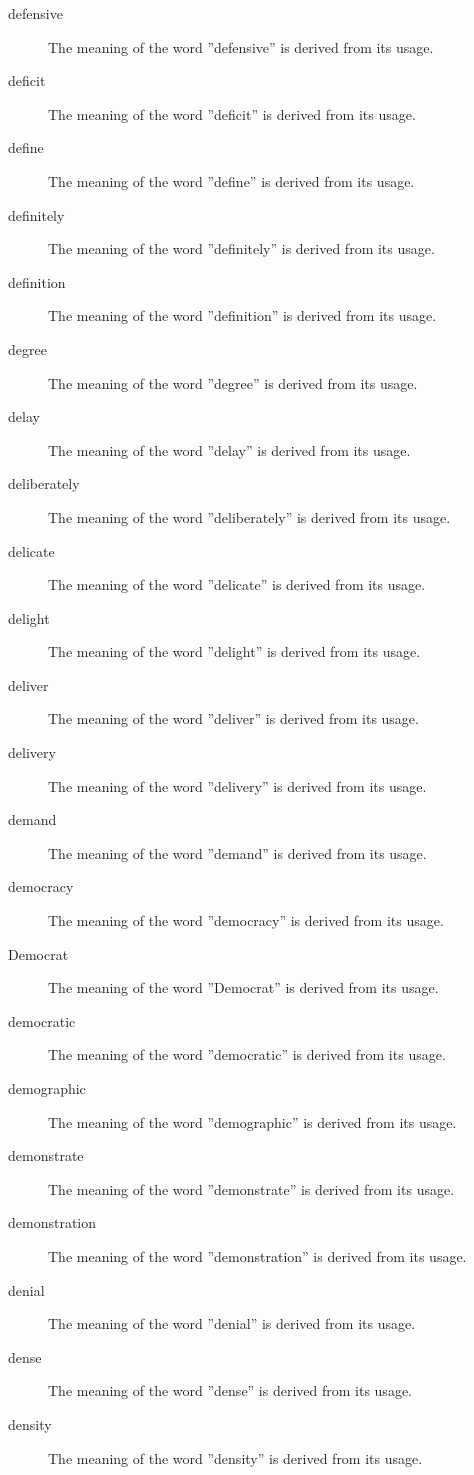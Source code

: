 \documentclass[12pt, letterpaper]{memoir}
\begin{document}
\begin{description}
\item[defensive] The meaning of the word ''defensive'' is derived from its usage.
\item[deficit] The meaning of the word ''deficit'' is derived from its usage.
\item[define] The meaning of the word ''define'' is derived from its usage.
\item[definitely] The meaning of the word ''definitely'' is derived from its usage.
\item[definition] The meaning of the word ''definition'' is derived from its usage.
\item[degree] The meaning of the word ''degree'' is derived from its usage.
\item[delay] The meaning of the word ''delay'' is derived from its usage.
\item[deliberately] The meaning of the word ''deliberately'' is derived from its usage.
\item[delicate] The meaning of the word ''delicate'' is derived from its usage.
\item[delight] The meaning of the word ''delight'' is derived from its usage.
\item[deliver] The meaning of the word ''deliver'' is derived from its usage.
\item[delivery] The meaning of the word ''delivery'' is derived from its usage.
\item[demand] The meaning of the word ''demand'' is derived from its usage.
\item[democracy] The meaning of the word ''democracy'' is derived from its usage.
\item[Democrat] The meaning of the word ''Democrat'' is derived from its usage.
\item[democratic] The meaning of the word ''democratic'' is derived from its usage.
\item[demographic] The meaning of the word ''demographic'' is derived from its usage.
\item[demonstrate] The meaning of the word ''demonstrate'' is derived from its usage.
\item[demonstration] The meaning of the word ''demonstration'' is derived from its usage.
\item[denial] The meaning of the word ''denial'' is derived from its usage.
\item[dense] The meaning of the word ''dense'' is derived from its usage.
\item[density] The meaning of the word ''density'' is derived from its usage.

\end{description}
\end{document}
